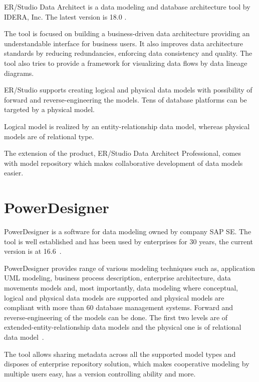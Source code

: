 ER/Studio Data Architect is a data modeling and database architecture tool by IDERA, Inc. 
The latest version is 18.0 \cite{ErStudio}.

The tool is focused on building a business-driven data architecture providing an understandable interface for business users. It also improves data architecture standards by reducing redundancies, enforcing data consistency and quality.
The tool also tries to provide a framework for visualizing data flows by data lineage diagrams. 

ER/Studio supports creating logical and physical data models with possibility of forward and reverse-engineering the models. Tens of database platforms can be targeted by a physical model.

Logical model is realized by an entity-relationship data model, whereas physical models are of relational type.

The  extension of the product, ER/Studio Data Architect Professional, comes with model repository which makes collaborative development of data models easier. 

\section{PowerDesigner}

PowerDesigner is a software for data modeling owned by company SAP SE. The tool is well established and has been used by enterprises for 30 years, the current version is at 16.6~\cite{PowerDesignerHistory}.

PowerDesigner provides range of various modeling techniques such as, application UML modeling, business process description, enterprise architecture, data movements models and, most importantly, data modeling where conceptual, logical and physical data models are supported and physical models are compliant with more than 60 database management systems.
Forward and reverse-engineering of the models can be done.
The first two levels are of extended-entity-relationship data models and the physical one is of relational data model~\cite{PowerDesignerFeatures}.

The tool allows sharing metadata across all the supported model types and disposes of enterprise repository solution, which makes cooperative modeling by multiple users easy, has a version controlling ability and more.